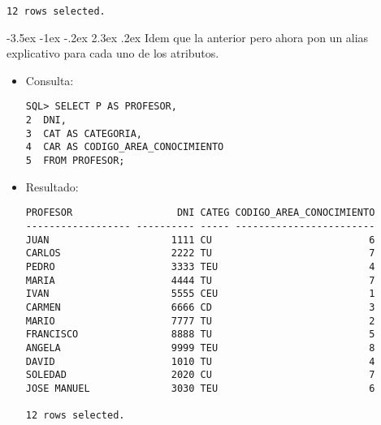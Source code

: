\documentclass[11pt]{report}
\makeatletter
\renewcommand\chapter{\@startsection{chapter}{0}{\z@}%
    {-3.5ex \@plus -1ex \@minus -.2ex}%
    {2.3ex \@plus.2ex}%
    {\normalfont\Large\bfseries}}
\makeatother
\begin{document}
\begin{itemize}
\begin{verbatim}
12 rows selected.
  \end{verbatim}
\end{itemize}

\chapter{Idem que la anterior pero ahora pon un alias explicativo para cada uno de los atributos.}
\begin{itemize}
  \item Consulta:
  \begin{verbatim}
SQL> SELECT P AS PROFESOR,
2  DNI,
3  CAT AS CATEGORIA,
4  CAR AS CODIGO_AREA_CONOCIMIENTO
5  FROM PROFESOR;
  \end{verbatim}
  \item{Resultado:}
  \begin{verbatim}
PROFESOR                  DNI CATEG CODIGO_AREA_CONOCIMIENTO                                                                                                  
------------------ ---------- ----- ------------------------                                                                                                  
JUAN                     1111 CU                           6                                                                                                  
CARLOS                   2222 TU                           7                                                                                                  
PEDRO                    3333 TEU                          4                                                                                                  
MARIA                    4444 TU                           7                                                                                                  
IVAN                     5555 CEU                          1                                                                                                  
CARMEN                   6666 CD                           3                                                                                                  
MARIO                    7777 TU                           2                                                                                                  
FRANCISCO                8888 TU                           5                                                                                                  
ANGELA                   9999 TEU                          8                                                                                                  
DAVID                    1010 TU                           4                                                                                                  
SOLEDAD                  2020 CU                           7                                                                                                  
JOSE MANUEL              3030 TEU                          6                                                                                                  

12 rows selected.
  \end{verbatim}
\end{itemize}
\end{document}
